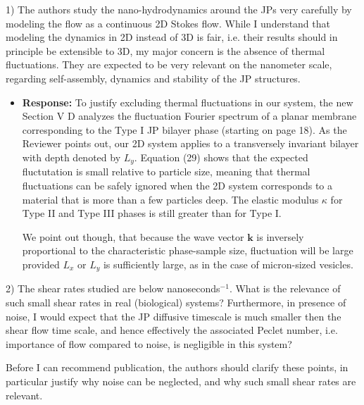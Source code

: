 \documentclass[11pt]{article}
\newcommand{\comment}[1]{{\color{blue} #1}}
\begin{document}
\noindent
\comment{1) The authors study the nano-hydrodynamics around the JPs very carefully by
modeling the flow as a continuous 2D Stokes flow. While I understand that
modeling the dynamics in 2D instead of 3D is fair, i.e. their results should in
principle be extensible to 3D, my major concern is the absence of thermal
fluctuations. They are expected to be very relevant on the nanometer scale,
regarding self-assembly, dynamics and stability of the JP structures.
}

\begin{itemize}
\item {\bf Response:}
  To justify excluding thermal fluctuations in our system,
  the new Section V D 
  analyzes the fluctuation Fourier spectrum 
  of a planar membrane corresponding to the Type I JP bilayer phase
  (starting on page 18).
  As the Reviewer points out, our 2D system applies
  to a transversely invariant bilayer with depth denoted by $L_y$.
  Equation (29) shows that the expected fluctutation is small
  relative to particle size, meaning that thermal fluctuations can
  be safely ignored when the 2D system corresponds to a material that 
  is more than a few particles deep.  The elastic modulus $\kappa$ for
  Type II and Type III phases is still greater than for Type I.

  We point out though, that because the wave vector $\mathbf{k}$ is inversely
  proportional to the characteristic phase-sample size,
  fluctuation will be large provided $L_x$ or $L_y$ is sufficiently large,
  as in the case of micron-sized vesicles.
\end{itemize}

\noindent
\comment{2) The shear rates studied are below nanoseconds$^{-1}$. What is the relevance of
such small shear rates in real (biological) systems? Furthermore, in presence of
noise, I would expect that the JP diffusive timescale is much smaller then the
shear flow time scale, and hence effectively the associated Peclet number, i.e.
importance of flow compared to noise, is negligible in this system?

Before I can recommend publication, the authors should clarify these points, in
particular justify why noise can be neglected, and why such small shear rates
are relevant.}
\end{document}
